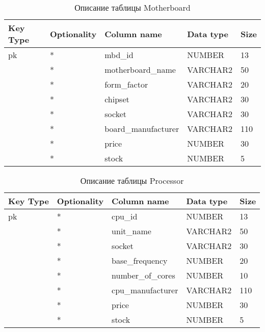 \begin{xltabular}{\textwidth}{|X|X|p{4.0cm}|X|X|}
	\caption{Описание таблицы Motherboard\label{tab:motherboard}}\\
	\hline
	Key Type & Optionality & Column name & Data type & Size \\ \hline
	pk & * & mbd\_id & NUMBER & 13 \\ \hline
	& * & motherboard\_name & VARCHAR2 & 50 \\ \hline
	& * & form\_factor & VARCHAR2 & 20 \\ \hline
	& * & chipset & VARCHAR2 & 30 \\ \hline
	& * & socket & VARCHAR2 & 30 \\ \hline
	& * & board\_manufacturer & VARCHAR2 & 110 \\ \hline
	& * & price & NUMBER & 30 \\ \hline
	& * & stock & NUMBER & 5 \\ \hline
\end{xltabular}

\newpage

\begin{xltabular}{\textwidth}{|X|X|p{4.0cm}|X|X|}
	\caption{Описание таблицы Processor\label{tab:processor}}\\
	\hline
	Key Type & Optionality & Column name & Data type & Size \\ \hline
	pk & * & cpu\_id & NUMBER & 13 \\ \hline
	& * & unit\_name & VARCHAR2 & 50 \\ \hline
	& * & socket & VARCHAR2 & 30 \\ \hline
	& * & base\_frequency & NUMBER & 20 \\ \hline
	& * & number\_of\_cores & NUMBER & 10 \\ \hline
	& * & cpu\_manufacturer & VARCHAR2 & 110 \\ \hline
	& * & price & NUMBER & 30 \\ \hline
	& * & stock & NUMBER & 5 \\ \hline
\end{xltabular}

